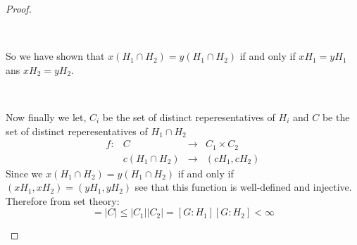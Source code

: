 \begin{exercise}
\begin{proof}
\begin{enumerate}[label = (\alph*)]
            \

            So we have shown that $x(H_1\cap H_2) = y(H_1\cap H_2)$ if and only if $xH_1 = yH_1$ ans $xH_2=yH_2$.

            \

            Now finally we let, $C_i$ be the set of distinct reperesentatives of $H_i$ and $C$ be the set of distinct reperesentatives of $H_1\cap H_2$ \[\begin{array}{cccc}
                f\colon &C&\rightarrow& C_1\times C_2\\
                        &c(H_1\cap H_2)&\rightarrow& (cH_1,cH_2)
            \end{array}\]
            Since we $x(H_1\cap H_2) = y(H_1\cap H_2)$ if and only if $(xH_1,xH_2) = (yH_1,yH_2)$ see that this function is well-defined and injective. Therefore from set theory:\begin{equation*}
                [G\colon H_1\cap H_2] = |C|\leq |C_1||C_2| = [G\colon H_1][G\colon H_2] < \infty
            \end{equation*}

        \end{enumerate}
    \end{proof}
    \end{exercise}

